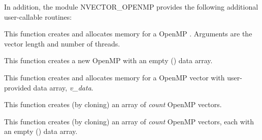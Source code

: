 \documentclass[letterpaper,10pt,english]{sphinxmanual}
\begin{document}
In addition, the module NVECTOR\_OPENMP provides the following
additional user-callable routines:

\begin{fulllineitems}
\label{nvectors/NVector_OpenMP:c.N_VNew_OpenMP}
This function creates and allocates memory for a OpenMP
. Arguments are the vector length and number of threads.

\end{fulllineitems}


\begin{fulllineitems}
\label{nvectors/NVector_OpenMP:c.N_VNewEmpty_OpenMP}
This function creates a new OpenMP  with an empty
() data array.

\end{fulllineitems}


\begin{fulllineitems}
\label{nvectors/NVector_OpenMP:c.N_VMake_OpenMP}
This function creates and allocates memory for a OpenMP vector with
user-provided data array, \emph{v\_data}.

\end{fulllineitems}


\begin{fulllineitems}
\label{nvectors/NVector_OpenMP:c.N_VCloneVectorArray_OpenMP}
This function creates (by cloning) an array of \emph{count} OpenMP
vectors.

\end{fulllineitems}


\begin{fulllineitems}
\label{nvectors/NVector_OpenMP:c.N_VCloneEmptyVectorArray_OpenMP}
This function creates (by cloning) an array of \emph{count} OpenMP
vectors, each with an empty () data array.

\end{fulllineitems}
\end{document}
